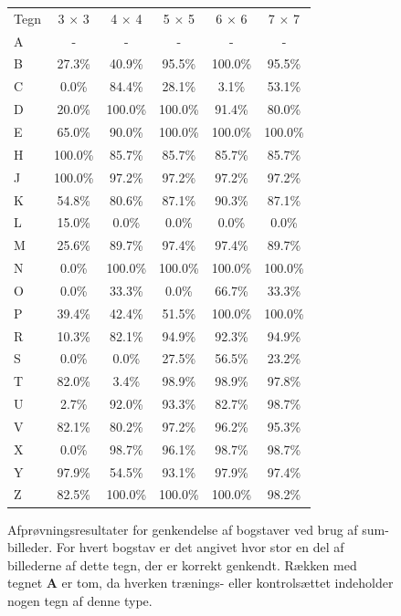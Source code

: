 \begin{figure}[htp]
\centering
\begin{tabular}{|l|c|c|c|c|c|}\hline
\rowcolor[gray]{0.9} \multicolumn{6}{|>{\columncolor[gray]{0.9}}c|}{\textbf{Genkendelse af bogstaver - Sum-billeder}} \\ \hline
Tegn & 3 $\times$ 3 & 4 $\times$ 4 & 5 $\times$ 5 & 6 $\times$ 6 & 7 $\times$ 7 \\\hline
A & - & - & - & - & -\\\hline
B & 27.3\% & 40.9\% & 95.5\% & 100.0\% & 95.5\%\\\hline
C & 0.0\% & 84.4\% & 28.1\% & 3.1\% & 53.1\%\\\hline
D & 20.0\% & 100.0\% & 100.0\% & 91.4\% & 80.0\%\\\hline
E & 65.0\% & 90.0\% & 100.0\% & 100.0\% & 100.0\%\\\hline
H & 100.0\% & 85.7\% & 85.7\% & 85.7\% & 85.7\%\\\hline
J & 100.0\% & 97.2\% & 97.2\% & 97.2\% & 97.2\%\\\hline
K & 54.8\% & 80.6\% & 87.1\% & 90.3\% & 87.1\%\\\hline 
L & 15.0\% & 0.0\% & 0.0\% & 0.0\% & 0.0\%\\\hline
M & 25.6\% & 89.7\% & 97.4\% & 97.4\% & 89.7\%\\\hline
N & 0.0\% & 100.0\% & 100.0\% & 100.0\% & 100.0\%\\\hline
O & 0.0\% & 33.3\% & 0.0\% & 66.7\% & 33.3\%\\\hline
P & 39.4\% & 42.4\% & 51.5\% & 100.0\% & 100.0\%\\\hline
R & 10.3\% & 82.1\% & 94.9\% & 92.3\% & 94.9\%\\\hline
S & 0.0\% & 0.0\% & 27.5\% & 56.5\% & 23.2\%\\\hline
T & 82.0\% & 3.4\% & 98.9\% & 98.9\% & 97.8\%\\\hline
U & 2.7\% & 92.0\% & 93.3\% & 82.7\% & 98.7\%\\\hline
V & 82.1\% & 80.2\% & 97.2\% & 96.2\% & 95.3\%\\\hline
X & 0.0\% & 98.7\% & 96.1\% & 98.7\% & 98.7\%\\\hline
Y & 97.9\% & 54.5\% & 93.1\% & 97.9\% & 97.4\%\\\hline
Z & 82.5\% & 100.0\% & 100.0\% & 100.0\% & 98.2\%\\\hline
\end{tabular}
\caption{Afprøvningsresultater for genkendelse af bogstaver ved brug af sum-billeder. For hvert bogstav er det angivet hvor stor en del af billederne af dette tegn, der er korrekt genkendt. Rækken med tegnet \textbf{A} er tom, da hverken trænings- eller kontrolsættet indeholder nogen tegn af denne type.}
\label{fig:test:sum_bogstav}
\end{figure}

